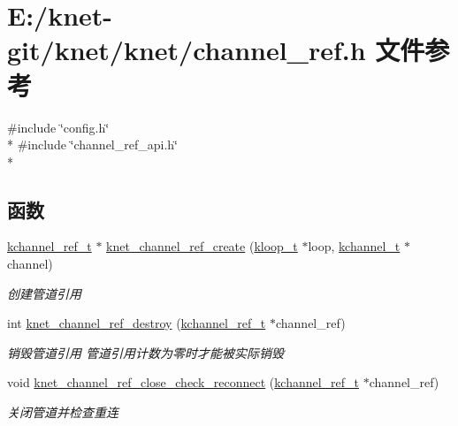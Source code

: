 \hypertarget{a00049}{}\section{E\+:/knet-\/git/knet/knet/channel\+\_\+ref.h 文件参考}
\label{a00049}
{\ttfamily \#include \char`\"{}config.\+h\char`\"{}}\\*
{\ttfamily \#include \char`\"{}channel\+\_\+ref\+\_\+api.\+h\char`\"{}}\\*
\subsection*{函数}
\begin{DoxyCompactItemize}
\item 
\hyperlink{a00051_a3b7e82599367eade261456f60ebe2cd9_a3b7e82599367eade261456f60ebe2cd9}{kchannel\+\_\+ref\+\_\+t} $\ast$ \hyperlink{a00049_ab3c8eae266a90aee181b0cf4e9bcc731_ab3c8eae266a90aee181b0cf4e9bcc731}{knet\+\_\+channel\+\_\+ref\+\_\+create} (\hyperlink{a00051_a97fc76209a58362019f1ded9169e397f_a97fc76209a58362019f1ded9169e397f}{kloop\+\_\+t} $\ast$loop, \hyperlink{a00051_aca9cd34897582aa9969245a93cc62fb5_aca9cd34897582aa9969245a93cc62fb5}{kchannel\+\_\+t} $\ast$channel)
\begin{DoxyCompactList}\small\item\em 创建管道引用 \end{DoxyCompactList}\item 
int \hyperlink{a00049_ae61ef5acd0738591947edac25e2d0ccf_ae61ef5acd0738591947edac25e2d0ccf}{knet\+\_\+channel\+\_\+ref\+\_\+destroy} (\hyperlink{a00051_a3b7e82599367eade261456f60ebe2cd9_a3b7e82599367eade261456f60ebe2cd9}{kchannel\+\_\+ref\+\_\+t} $\ast$channel\+\_\+ref)
\begin{DoxyCompactList}\small\item\em 销毁管道引用 管道引用计数为零时才能被实际销毁 \end{DoxyCompactList}\item 
void \hyperlink{a00049_a0bbe382b036918b6a75f8d2d3e8b6a44_a0bbe382b036918b6a75f8d2d3e8b6a44}{knet\+\_\+channel\+\_\+ref\+\_\+close\+\_\+check\+\_\+reconnect} (\hyperlink{a00051_a3b7e82599367eade261456f60ebe2cd9_a3b7e82599367eade261456f60ebe2cd9}{kchannel\+\_\+ref\+\_\+t} $\ast$channel\+\_\+ref)
\begin{DoxyCompactList}\small\item\em 关闭管道并检查重连 \end{DoxyCompactList}\item 

\end{DoxyCompactItemize}
